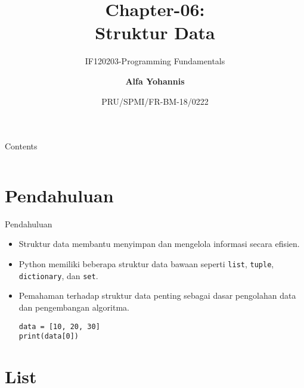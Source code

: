 \documentclass[aspectratio=169, table]{beamer}
\subtitle{IF120203-Programming Fundamentals}
\title{Chapter-06:\\\LARGE{Struktur Data\\}
\vspace{10pt}}
\date[Serial]{\scriptsize {PRU/SPMI/FR-BM-18/0222}}
\author[Pradita]{\small{\textbf{Alfa Yohannis}}}
\begin{document}
\frame{\titlepage}

\begin{frame}[fragile]{Contents}
\vspace{15pt}
\begin{columns}[t]
\begin{column}{.4\textwidth}
\tableofcontents[sections={1-7}]
\end{column}
\begin{column}{.6\textwidth}
\tableofcontents[sections={8-14}]
\end{column}
\end{columns}
\end{frame}


\section{Pendahuluan}


\begin{frame}[fragile]{Pendahuluan}
\vspace{20pt}

\begin{itemize}
  \item Struktur data membantu menyimpan dan mengelola informasi secara efisien. 
  \item Python memiliki beberapa struktur data bawaan seperti 
        \texttt{list}, \texttt{tuple}, \texttt{dictionary}, dan \texttt{set}. 
  \item Pemahaman terhadap struktur data penting sebagai dasar pengolahan data 
        dan pengembangan algoritma.
	\begin{lstlisting}[style=PythonStyle]
data = [10, 20, 30]
print(data[0])
\end{lstlisting}
\end{itemize}


\end{frame}


\section{List}
\end{document}
